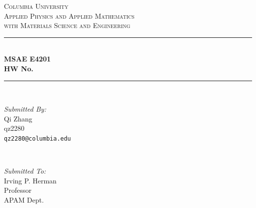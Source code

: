 \begin{titlepage}

	\newcommand{\HRule}{\rule{\linewidth}{0.5mm}} %

	\center %


	\textsc{\LARGE Columbia University}\\[0.3cm] %
	\textsc{\Large Applied Physics and Applied Mathematics\\
		\large with Materials Science and Engineering}\\[0.5cm] %


	\HRule \\[0.4cm]
	{ \huge \bfseries MSAE E4201\\[0.2cm]  HW No. }\\[0.03cm] %
	\HRule \\[1.5cm]



	\begin{minipage}{0.4\textwidth}
		\begin{flushleft} \large
			\emph{Submitted By:}\\
			Qi Zhang \\qz2280\\\texttt{qz2280@columbia.edu} %
		\end{flushleft}
	\end{minipage}
	~
	\begin{minipage}{0.4\textwidth}
		\begin{flushright} \large
			\emph{Submitted To:} \\
			Irving P. Herman\\Professor\\APAM Dept. %
		\end{flushright}
	\end{minipage}\\[1cm]


\end{titlepage}

